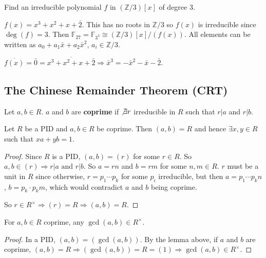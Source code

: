 \begin{example}
	Find an irreducible polynomial $f$ in $(\mathbb{Z} / 3)[x]$ of degree $3$.
	
	$f(x) = x^3 + x^2 + x + \bar{2}$. This has no roots in $\mathbb{Z} / 3$ so $f(x)$ is irreducible since $\deg(f) = 3$. Then $\mathbb{F}_{27} = \mathbb{F}_{3^3} \cong (\mathbb{Z} / 3) [x] / (f(x))$. All elements can be written as $a_0 + a_1 \bar{x} + a_2 \bar{x}^2$, $a_i \in \mathbb{Z} / 3$.

	$\overline{f(x)} = \bar{0} = \overline{x^3 + x^2 + x + \bar{2}} \Rightarrow \bar{x}^3 = - \bar{x}^2 - \bar{x} - \bar{2}$.
\end{example}

\subsection{The Chinese Remainder Theorem (CRT)}

\begin{definition}
	Let $a, b \in R$. $a$ and $b$ are \textbf{coprime} if $\not\exists r$ irreducible in $R$ such that $r | a$ and $r | b$.
\end{definition}

\begin{lemma}
	Let $R$ be a PID and $a, b \in R$ be coprime. Then $(a, b) = R$ and hence $\exists x, y \in R$ such that $xa + yb = 1$.
\end{lemma}

\begin{proof}
	Since $R$ is a PID, $(a, b) = (r)$ for some $r \in R$. So $a, b \in (r) \Rightarrow r | a \text{ and } r | b$. So $a = rn$ and $b = rm$ for some $n, m \in R$. $r$ must be a unit in $R$ since otherwise, $r = p_1 \cdots p_k$ for some $p_i$ irreducible, but then $a = p_1 \cdots p_k n$, $b = p_k \cdot p_k m$, which would contradict $a$ and $b$ being coprime.

	So $r \in R^{\times} \Rightarrow (r) = R \Rightarrow (a, b) = R$.
\end{proof}

\begin{corollary}
	For $a, b \in R$ coprime, any $\gcd(a, b) \in R^{\times}$.
\end{corollary}

\begin{proof}
	In a PID, $(a, b) = (\gcd(a, b))$. By the lemma above, if $a$ and $b$ are coprime, $(a, b) = R \Rightarrow (\gcd(a, b)) = R = (1) \Rightarrow \gcd(a, b) \in R^{\times}$.
\end{proof}

